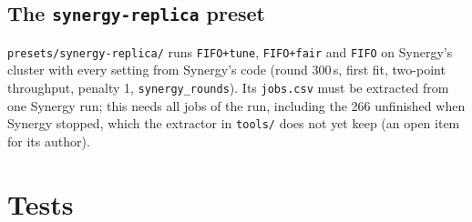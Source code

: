 \documentclass[11pt,a4paper]{article}
\newcommand{\code}[1]{\texttt{#1}}
\begin{document}
\subsection{The \code{synergy-replica} preset}
\code{presets/synergy-replica/} runs \code{FIFO+tune}, \code{FIFO+fair} and \code{FIFO} on Synergy's
cluster with every setting from Synergy's code (round 300\,s, first fit, two-point throughput, penalty
1, \code{synergy\_rounds}). Its \code{jobs.csv} must be extracted from one Synergy run; this needs all
jobs of the run, including the 266 unfinished when Synergy stopped, which the extractor in
\code{tools/} does not yet keep (an open item for its author).

\section{Tests}
\end{document}
